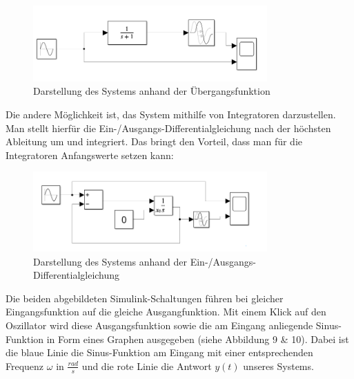 \begin{figure}[H]
    \centering
    \includegraphics[width=0.8\textwidth]{Bilder/SimulinkEinfach.png}
    \caption{Darstellung des Systems anhand der Übergangsfunktion}
 \end{figure}
Die andere Möglichkeit ist, das System mithilfe von Integratoren darzustellen. Man stellt hierfür die Ein-/Ausgangs-Differentialgleichung nach der höchsten Ableitung um und integriert. Das bringt den Vorteil, dass man für die Integratoren Anfangswerte setzen kann:


 \begin{figure}[H]
    \centering
    \includegraphics[width=0.8\textwidth]{Bilder/SimulinkKomplex.png}
    \caption{Darstellung des Systems anhand der Ein-/Ausgangs-Differentialgleichung}
 \end{figure}
Die beiden abgebildeten Simulink-Schaltungen führen bei gleicher Eingangsfunktion auf die gleiche Ausgangfunktion.
Mit einem Klick auf den Oszillator wird diese Ausgangsfunktion sowie die am Eingang anliegende Sinus-Funktion in Form eines Graphen ausgegeben (siehe Abbildung 9 \& 10). Dabei ist die blaue Linie die Sinus-Funktion am Eingang mit einer entsprechenden Frequenz $\omega$ in $\frac{rad}{s}$ und die rote Linie die Antwort $y(t)$ unseres Systems.

